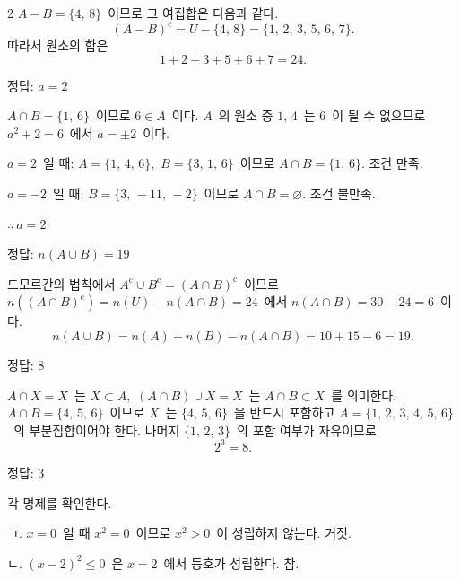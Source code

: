 \documentclass[10pt,fleqn]{article}
\begin{document}
\begin{multicols*}{2}
$A-B=\{4,\,8\}$\ 이므로 그 여집합은 다음과 같다.
\[ (A-B)^{\mathrm{c}}=U-\{4,\,8\}=\{1,\,2,\,3,\,5,\,6,\,7\}. \]
따라서 원소의 합은
\[ 1+2+3+5+6+7=24. \]

\begin{dmanswerbox}
정답: $a=2$
\end{dmanswerbox}

$A\cap B=\{1,\,6\}$\ 이므로 $6\in A$\ 이다. $A$\ 의 원소 중 $1,\,4$\ 는 $6$\ 이 될 수 없으므로 $a^{2}+2=6$\ 에서 $a=\pm 2$\ 이다.

$a=2$\ 일 때: $A=\{1,\,4,\,6\}$,\ $B=\{3,\,1,\,6\}$\ 이므로 $A\cap B=\{1,\,6\}$. 조건 만족.

$a=-2$\ 일 때: $B=\{3,\,-11,\,-2\}$\ 이므로 $A\cap B=\varnothing$. 조건 불만족.

$\therefore\ a=2$.
\begin{dmanswerbox}
정답: $n(A\cup B)=19$
\end{dmanswerbox}

드모르간의 법칙에서 $A^{\mathrm{c}}\cup B^{\mathrm{c}}=(A\cap B)^{\mathrm{c}}$\ 이므로 $n((A\cap B)^{\mathrm{c}})=n(U)-n(A\cap B)=24$\ 에서 $n(A\cap B)=30-24=6$\ 이다.
\[ n(A\cup B)=n(A)+n(B)-n(A\cap B)=10+15-6=19. \]

\begin{dmanswerbox}
정답: $8$
\end{dmanswerbox}

$A\cap X=X$\ 는 $X\subset A$,\ $(A\cap B)\cup X=X$\ 는 $A\cap B\subset X$\ 를 의미한다. $A\cap B=\{4,\,5,\,6\}$\ 이므로 $X$\ 는 $\{4,\,5,\,6\}$\ 을 반드시 포함하고 $A=\{1,\,2,\,3,\,4,\,5,\,6\}$\ 의 부분집합이어야 한다. 나머지 $\{1,\,2,\,3\}$\ 의 포함 여부가 자유이므로
\[ 2^{3}=8. \]

\begin{dmanswerbox}
정답: $3$
\end{dmanswerbox}

각 명제를 확인한다.

\vspace{3mm}
ㄱ. $x=0$\ 일 때 $x^{2}=0$\ 이므로 $x^{2}>0$\ 이 성립하지 않는다. 거짓.

ㄴ. $(x-2)^{2}\le 0$\ 은 $x=2$\ 에서 등호가 성립한다. 참.


\end{multicols*}
\end{document}
